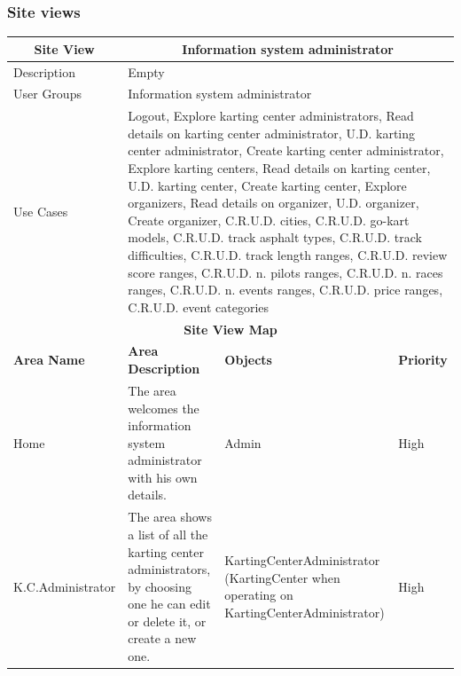 \documentclass{beamer}
\begin{document}
\begin{frame}
    \frametitle{Site views}
    \begin{table}
        \centering
        \tiny
        \setlength{\tabcolsep}{1pt}
        \begin{tabular}{|m{2cm}|m{4cm}|m{3cm}|m{1cm}|}
        \hline
        \multicolumn{1}{|c|}{\textbf{Site View}} & \multicolumn{3}{c|}{\textbf{Information system administrator}} \\
        \hline
        Description & \multicolumn{3}{m{8cm}|}{Empty} \\
        \hline
        User Groups & \multicolumn{3}{m{8cm}|}{Information system administrator} \\
        \hline
        Use Cases & \multicolumn{3}{m{8cm}|}{Logout, Explore karting center administrators, 
        Read details on karting center administrator, U.D. karting center administrator, 
        Create karting center administrator, Explore karting centers, 
        Read details on karting center, U.D. karting center, Create karting center, 
        Explore organizers, Read details on organizer, U.D. organizer, Create organizer, 
        C.R.U.D. cities, C.R.U.D. go-kart models, C.R.U.D. track asphalt types, 
        C.R.U.D. track difficulties, C.R.U.D. track length ranges, C.R.U.D. review score ranges, 
        C.R.U.D. n. pilots ranges, C.R.U.D. n. races ranges, C.R.U.D. n. events ranges, 
        C.R.U.D. price ranges, C.R.U.D. event categories } \\
        \hline
        \multicolumn{4}{|c|}{\textbf{Site View Map}} \\
        \hline
        \textbf{Area Name} & \textbf{Area Description} & \textbf{Objects} & \textbf{Priority} \\
        \hline
        Home & The area welcomes the information system administrator with his own details.
         & Admin & High \\
        \hline
        K.C.Administrator & The area shows a list of all the karting center administrators,
        by choosing one he can edit or delete it, or create a new one.
         & KartingCenterAdministrator (KartingCenter when operating
        on KartingCenterAdministrator) & High \\
        \hline
        \end{tabular}
    \end{table}
\end{frame}
\end{document}
